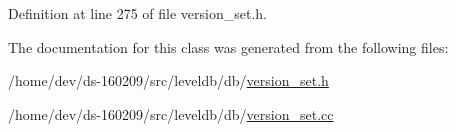 Definition at line 275 of file version\+\_\+set.\+h.



The documentation for this class was generated from the following files\+:\begin{DoxyCompactItemize}
\item 
/home/dev/ds-\/160209/src/leveldb/db/\hyperlink{version__set_8h}{version\+\_\+set.\+h}\item 
/home/dev/ds-\/160209/src/leveldb/db/\hyperlink{version__set_8cc}{version\+\_\+set.\+cc}\end{DoxyCompactItemize}

